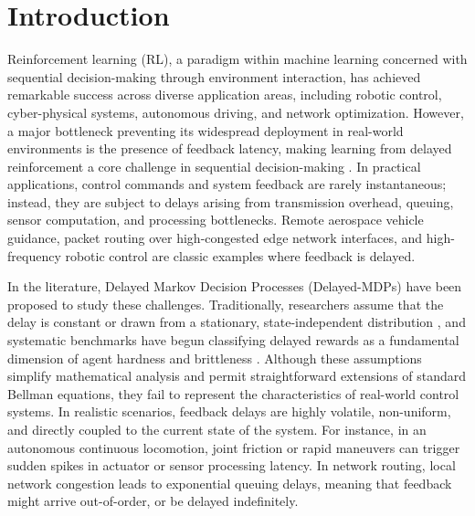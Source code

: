 \documentclass[manuscript, screen, review]{jair}
\begin{document}

\maketitle

\section{Introduction}
Reinforcement learning (RL), a paradigm within machine learning concerned with sequential decision-making through environment interaction, has achieved remarkable success across diverse application areas, including robotic control, cyber-physical systems, autonomous driving, and network optimization. However, a major bottleneck preventing its widespread deployment in real-world environments is the presence of feedback latency, making learning from delayed reinforcement a core challenge in sequential decision-making \citep{kaelbling1996reinforcement}. In practical applications, control commands and system feedback are rarely instantaneous; instead, they are subject to delays arising from transmission overhead, queuing, sensor computation, and processing bottlenecks. Remote aerospace vehicle guidance, packet routing over high-congested edge network interfaces, and high-frequency robotic control are classic examples where feedback is delayed.

In the literature, Delayed Markov Decision Processes (Delayed-MDPs) have been proposed to study these challenges. Traditionally, researchers assume that the delay is constant or drawn from a stationary, state-independent distribution \citep{katsikopoulos2003markov, ramstedt2019realtime}, and systematic benchmarks have begun classifying delayed rewards as a fundamental dimension of agent hardness and brittleness \citep{rajan2023mdp}. Although these assumptions simplify mathematical analysis and permit straightforward extensions of standard Bellman equations, they fail to represent the characteristics of real-world control systems. In realistic scenarios, feedback delays are highly volatile, non-uniform, and directly coupled to the current state of the system. For instance, in an autonomous continuous locomotion, joint friction or rapid maneuvers can trigger sudden spikes in actuator or sensor processing latency. In network routing, local network congestion leads to exponential queuing delays, meaning that feedback might arrive out-of-order, or be delayed indefinitely.
\end{document}
